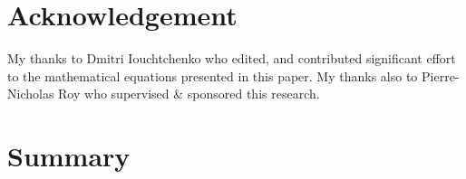 
\titleGM
\pagestyle{empty}

\clearpage


\doublespacing
\section*{Acknowledgement}
My thanks to Dmitri Iouchtchenko who edited, and contributed significant effort to the mathematical equations presented in this paper. 
My thanks also to Pierre-Nicholas Roy who supervised \& sponsored this research.
\newpage

\section*{Summary} 

\newpage

\pagestyle{plain}
\setcounter{page}{1}
\tableofcontents
\newpage

\listoffigures
\newpage

\listoftables
\newpage

\setcounter{page}{1}





\clearpage


\clearpage


\clearpage

\renewcommand*{\bibfont}{\scriptsize}
\printbibliography
